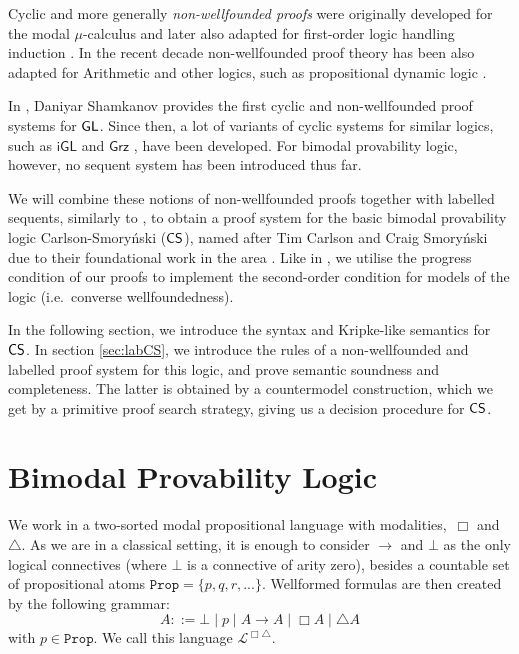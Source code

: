\documentclass[runningheads,orivec]{llncs}
\newcommand{\CS}{\textnormal{\textsf{CS}}}
\newcommand{\GL}{\textnormal{\textsf{GL}}}
\newcommand{\Dmnd}{\Diamond}
\newcommand{\spa}{\;|\;}
\newcommand{\grt}{\mathrel{\raisebox{.4ex}{\rotatebox[origin = c]{180}{$\triangle$}}\hspace{-1mm}}}
\newcommand{\La}{\mathcal{L}}
\newcommand{\LaBi}{\La^{\Box \triangle}}
\newcommand{\Prop}{\mathtt{Prop}}
\begin{document}
Cyclic and more generally \emph{non-wellfounded proofs} were originally developed for the modal $\mu$-calculus \cite{Niwiński96} and later also adapted for first-order logic handling induction \cite{Brotherston05,BrotherstonSimpson_2010}. In the recent decade non-wellfounded proof theory has been also adapted for Arithmetic \cite{Simpson_2017} and other logics, such as propositional dynamic logic \cite{DochertyRowe_2019}.

In \cite{Shamkanov14}, Daniyar Shamkanov provides the first cyclic and non-wellfounded proof systems for $\GL$. Since then, a lot of variants of cyclic systems for similar logics, such as $\mathsf{iGL}$ \cite{Iemhoff16,SierraMiranda23} and $\mathsf{Grz}$ \cite{Savateev17}, have been developed. For bimodal provability logic, however, no sequent system has been introduced thus far. 

We will combine these notions of non-wellfounded proofs together with labelled sequents, similarly to \cite{Das_et_al24}, to obtain a proof system for the basic bimodal provability logic Carlson-Smoryński ($\CS$), named after Tim Carlson and Craig Smoryński due to their foundational work in the area \cite{Carlson86,Smorynski85}.
Like in \cite{Das_et_al24}, we utilise the progress condition of our proofs to implement the second-order condition for models of the logic (i.e.~converse wellfoundedness).


In the following section, we introduce the syntax and Kripke-like semantics for $\CS$. In section \ref{sec:labCS}, we introduce the rules of a non-wellfounded and labelled proof system for this logic, and prove semantic soundness and completeness. The latter is obtained by a countermodel construction, which we get by a primitive proof search strategy, giving us a decision procedure for $\CS$. 


\section{Bimodal Provability Logic}

We work in a two-sorted modal propositional language with modalities,~$\Box$ and~$\triangle$. As we are in a classical setting, it is enough to consider $\to$ and $\bot$ as the only logical connectives (where $\bot$ is a connective of arity zero), besides a countable set of propositional atoms $\Prop = \{p,q,r,... \}$. Wellformed formulas are then created by the following grammar:
$$A::= \bot \spa p \spa A \to A \spa \Box A \spa \triangle A$$ 
%
with $p \in \Prop$. We call this language $\LaBi$. 
\end{document}
